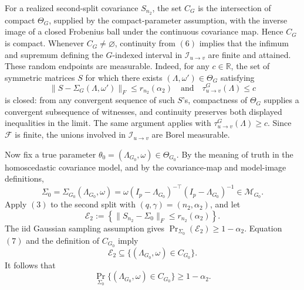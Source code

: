 For a realized second-split covariance \(S_{n_2}\), the set \(C_G\) is the intersection of compact \(\Theta_G\), supplied by the compact-parameter assumption, with the inverse image of a closed Frobenius ball under the continuous covariance map.  Hence \(C_G\) is compact.  Whenever \(C_G\ne\varnothing\), continuity from \((6)\) implies that the infimum and supremum defining the \(G\)-indexed interval in \(\mathcal I_{u\to v}\) are finite and attained.  These random endpoints are measurable.  Indeed, for any \(c\in\mathbb R\), the set of symmetric matrices \(S\) for which there exists \((\Lambda,\omega')\in\Theta_G\) satisfying
\[
 \|S-\Sigma_G(\Lambda,\omega')\|_F\le r_{n_2}(\alpha_2)
 \quad\text{and}\quad
 \tau_{u\to v}^G(\Lambda)\le c
\]
is closed: from any convergent sequence of such \(S\)'s, compactness of \(\Theta_G\) supplies a convergent subsequence of witnesses, and continuity preserves both displayed inequalities in the limit.  The same argument applies with \(\tau_{u\to v}^G(\Lambda)\ge c\).  Since \(\mathcal F\) is finite, the unions involved in \(\mathcal I_{u\to v}\) are Borel measurable.

Now fix a true parameter \(\theta_0=(\Lambda_{G_0},\omega)\in\Theta_{G_0}\).  By the meaning of truth in the homoscedastic covariance model, and by the covariance-map and model-image definitions,
\[
 \Sigma_0
 =\Sigma_{G_0}(\Lambda_{G_0},\omega)
 =\omega(I_p-\Lambda_{G_0})^{-\top}(I_p-\Lambda_{G_0})^{-1}
 \in\mathcal M_{G_0}.
\tag{7}
\]
Apply \((3)\) to the second split with \((q,\gamma)=(n_2,\alpha_2)\), and let
\[
 \mathcal E_2
 :=\left\{\|S_{n_2}-\Sigma_0\|_F\le r_{n_2}(\alpha_2)\right\}.
\]
The iid Gaussian sampling assumption gives
\(\Pr_{\Sigma_0}(\mathcal E_2)\ge1-\alpha_2\).  Equation \((7)\) and the definition of \(C_{G_0}\) imply
\[
 \mathcal E_2
 \subseteq
 \{(\Lambda_{G_0},\omega)\in C_{G_0}\}.
\]
It follows that
\[
 \Pr_{\Sigma_0}\{(\Lambda_{G_0},\omega)\in C_{G_0}\}
 \ge1-\alpha_2.
\tag{8}
\]

